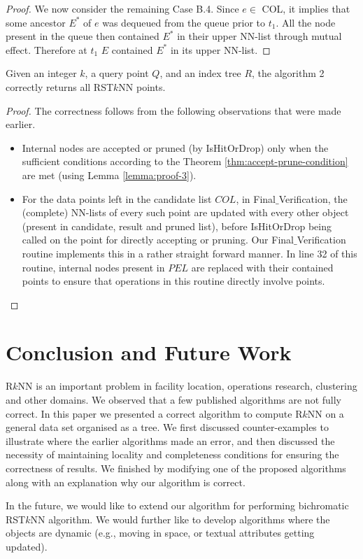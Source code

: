 \documentclass[prodmode,letterpaper]{acmsmall}
\newcommand{\rknn}{R$k$NN\xspace}
\newcommand{\rstknn}{RST$k$NN\xspace}
\begin{document}
\begin{proof}
We now consider the remaining Case B.4. Since $e \in$ COL, it implies that
some ancestor $E^*$ of $e$ was dequeued from the queue prior to $t_1$. All the
node present in the queue then contained $E^*$ in their upper NN-list through
mutual effect. Therefore at $t_1$ $E$ contained $E^*$ in its
upper NN-list.
\end{proof}

\begin{theorem}
Given an integer $k$, a query point $Q$, and an index tree $R$, the algorithm 2 correctly returns all \rstknn points.
\end{theorem}
\begin{proof}
The correctness follows from the following observations that were made earlier.
\begin{itemize}
    \item Internal nodes are accepted or pruned (by IsHitOrDrop) only when the sufficient
conditions according to the Theorem
\ref{thm:accept-prune-condition} are met (using Lemma \ref{lemma:proof-3}).
    \item For the data points left in the candidate list $COL$, in Final$\_$Verification,
the (complete) NN-lists of every such point are updated with every other object
(present in candidate, result and pruned list), before IsHitOrDrop being called
on the point for directly accepting or pruning. Our Final$\_$Verification routine
implements this in a rather straight forward manner. In line 32 of this routine,
internal nodes present in $PEL$ are replaced with their contained points to
ensure that operations in this routine directly involve points.

\end{itemize}
\end{proof}

\section{Conclusion and Future Work}\label{sec:Conclusion and Future Work}
\rknn is an important problem in facility location, operations research,
clustering and other domains. We observed that a few published algorithms are
not fully correct. In this paper we presented a correct algorithm to compute \rknn on a
general data set organised as a tree. We first discussed counter-examples to
illustrate where the earlier algorithms made an error, and then discussed
the necessity of maintaining locality and completeness conditions for ensuring
the correctness of results. We finished by modifying one of the proposed
algorithms along with an explanation why our algorithm is correct.

In the future, we would like to extend our algorithm for performing bichromatic
\rstknn algorithm. We would further like to develop algorithms where the objects
are dynamic (e.g., moving in space, or textual attributes getting updated).



\end{document}
